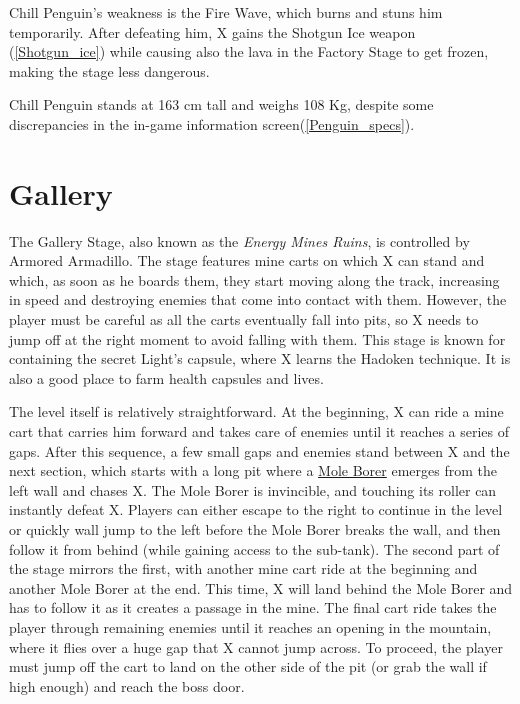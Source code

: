 Chill Penguin's weakness is the Fire Wave, which burns and stuns him temporarily. After defeating him, X gains the Shotgun Ice weapon (\ref{Shotgun_ice}) while causing also  the lava in the Factory Stage to get frozen, making the stage less dangerous.

Chill Penguin stands at 163 cm tall and weighs 108 Kg, despite some discrepancies in the in-game information screen(\ref{Penguin_specs}).


\section{Gallery}
The Gallery Stage, also known as the \textit{Energy Mines Ruins}, is controlled by Armored Armadillo. The stage features mine carts on which X can stand and which, as soon as he boards them, they start moving along the track, increasing in speed and destroying enemies that come into contact with them. However, the player must be careful as all the carts eventually fall into pits, so X needs to jump off at the right moment to avoid falling with them. This stage is known for containing the secret Light's capsule, where X learns the Hadoken technique. It is also a good place to farm health capsules and lives.

The level itself is relatively straightforward. At the beginning, X can ride a mine cart that carries him forward and takes care of enemies until it reaches a series of gaps. After this sequence, a few small gaps and enemies stand between X and the next section, which starts with a long pit where a \hyperlink{miniboss:Mole_Borer}{Mole Borer} emerges from the left wall and chases X. The Mole Borer is invincible, and touching its roller can instantly defeat X. Players can either escape to the right to continue in the level or quickly wall jump to the left before the Mole Borer breaks the wall, and then follow it from behind (while gaining access to the sub-tank). The second part of the stage mirrors the first, with another mine cart ride at the beginning and another Mole Borer at the end. This time, X will land behind the Mole Borer and has to follow it as it creates a passage in the mine. The final cart ride takes the player through remaining enemies until it reaches an opening in the mountain, where it flies over a huge gap that X cannot jump across. To proceed, the player must jump off the cart to land on the other side of the pit (or grab the wall if high enough) and reach the boss door.

